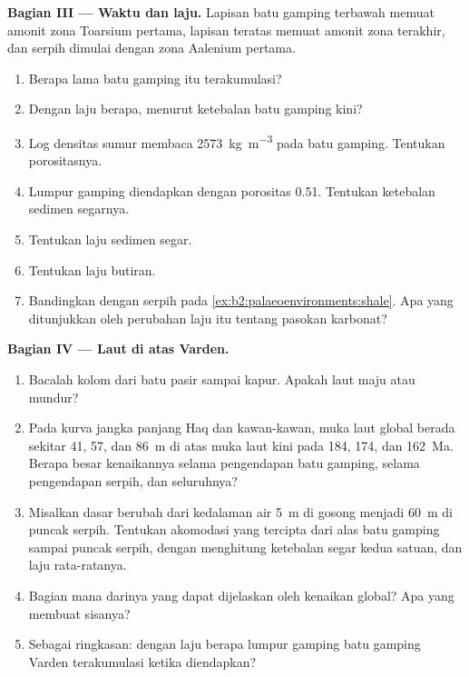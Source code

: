 \begin{problem}
\medskip\noindent\textbf{Bagian III --- Waktu dan laju.} Lapisan batu gamping terbawah memuat
amonit zona Toarsium pertama, lapisan teratas memuat amonit zona terakhir, dan serpih dimulai dengan
zona Aalenium pertama.
\begin{enumerate}[resume]
  \item Berapa lama batu gamping itu terakumulasi?
  \item Dengan laju berapa, menurut ketebalan batu gamping kini?
  \item Log densitas sumur membaca \qty{2573}{kg.m^{-3}} pada batu gamping. Tentukan
        porositasnya.
  \item Lumpur gamping diendapkan dengan porositas 0.51. Tentukan ketebalan sedimen segarnya.
  \item Tentukan laju sedimen segar.
  \item Tentukan laju butiran.
  \item Bandingkan dengan serpih pada \cref{ex:b2:palaeoenvironments:shale}. Apa yang ditunjukkan oleh perubahan
        laju itu tentang pasokan karbonat?
\end{enumerate}

\medskip\noindent\textbf{Bagian IV --- Laut di atas Varden.}
\begin{enumerate}[resume]
  \item Bacalah kolom dari batu pasir sampai kapur. Apakah laut maju atau mundur?
  \item Pada kurva jangka panjang Haq dan kawan-kawan, muka laut global berada sekitar 41, 57, dan
        \qty{86}{m} di atas muka laut kini pada 184, 174, dan \qty{162}{Ma}. Berapa besar kenaikannya selama
        pengendapan batu gamping, selama pengendapan serpih, dan seluruhnya?
  \item Misalkan dasar berubah dari kedalaman air \qty{5}{m} di gosong menjadi \qty{60}{m} di puncak
        serpih. Tentukan akomodasi yang tercipta dari alas batu gamping sampai puncak
        serpih, dengan menghitung ketebalan segar kedua satuan, dan laju rata-ratanya.
  \item Bagian mana darinya yang dapat dijelaskan oleh kenaikan global? Apa yang membuat sisanya?
  \item Sebagai ringkasan: dengan laju berapa lumpur gamping batu gamping Varden terakumulasi ketika
        diendapkan?
\end{enumerate}
\end{problem}

